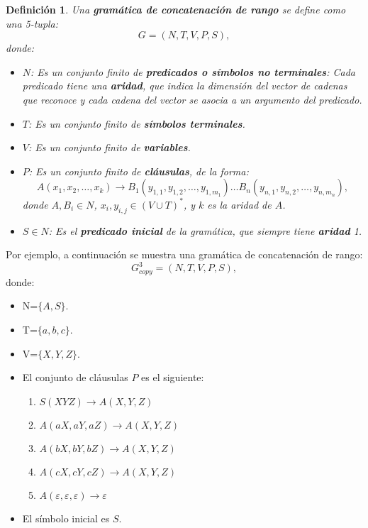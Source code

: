\documentclass{article}
\newtheorem{definition}{Definición}
\begin{document}
\begin{definition}
    Una \textbf{gramática de concatenación de rango} se define como una 5-tupla:
    \[
        G = (N, T, V, P, S),
    \]
    donde:

    \begin{itemize}
        \item $N$: Es un conjunto finito de \textbf{predicados o símbolos no terminales}: Cada predicado tiene una \textbf{aridad}, que indica la dimensión del vector de cadenas que reconoce y cada cadena del vector se asocia a un argumento del predicado.
        \item $T$: Es un conjunto finito de \textbf{símbolos terminales}.
        \item $V$: Es un conjunto finito de \textbf{variables}.
        \item $P$: Es un conjunto finito de \textbf{cláusulas}, de la forma:
              \[
                  A(x_1, x_2, \ldots, x_k) \to B_1(y_{1,1}, y_{1,2}, \ldots, y_{1,m_1}) \ldots B_n(y_{n,1}, y_{n,2}, \ldots, y_{n,m_n}),
              \]
              donde $A, B_i \in N$, $x_i, y_{i,j} \in (V \cup T)^*$, y $k$ es la aridad de $A$.
        \item $S \in N$: Es el \textbf{predicado inicial} de la gramática, que siempre tiene \textbf{aridad} 1.
    \end{itemize}
\end{definition}


Por ejemplo, a continuación se muestra una gramática de concatenación de rango:
\label{g_3copy}
\[
    G^3_{copy} = (N, T, V, P, S),
\]
donde:

\begin{itemize}
    \item  N=$\{A,S\}$.
    \item T=$\{a,b,c\}$.
    \item V=$\{X,Y,Z\}$.
    \item El conjunto de cláusulas $P$ es el siguiente:
          \begin{enumerate}
              \item $S(XYZ)\to A(X,Y,Z)$
              \item $A(aX,aY,aZ)\to A(X,Y,Z)$
              \item $A(bX,bY,bZ)\to A(X,Y,Z)$
              \item $A(cX,cY,cZ)\to A(X,Y,Z)$
              \item $A(\varepsilon,\varepsilon,\varepsilon)\to \varepsilon$
          \end{enumerate}
    \item El símbolo inicial es $S$.
\end{itemize}
\end{document}

